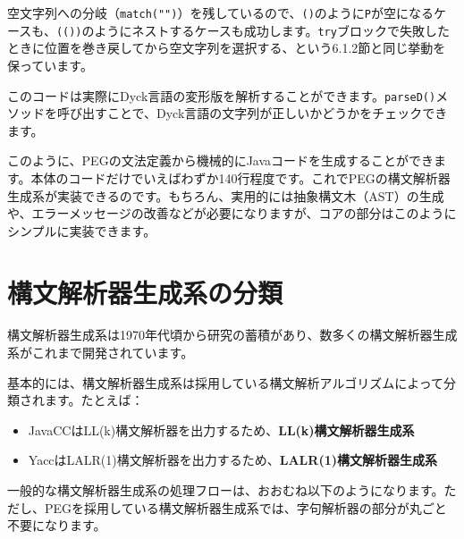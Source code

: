空文字列への分岐（\texttt{match("")}）を残しているので、\texttt{()}のように\texttt{P}が空になるケースも、\texttt{(())}のようにネストするケースも成功します。\texttt{try}ブロックで失敗したときに位置を巻き戻してから空文字列を選択する、という6.1.2節と同じ挙動を保っています。

このコードは実際にDyck言語の変形版を解析することができます。\texttt{parseD()}メソッドを呼び出すことで、Dyck言語の文字列が正しいかどうかをチェックできます。

このように、PEGの文法定義から機械的にJavaコードを生成することができます。本体のコードだけでいえばわずか140行程度です。これでPEGの構文解析器生成系が実装できるのです。もちろん、実用的には抽象構文木（AST）の生成や、エラーメッセージの改善などが必要になりますが、コアの部分はこのようにシンプルに実装できます。

\hypertarget{chapter6-ux69cbux6587ux89e3ux6790ux5668ux751fux6210ux7cfbux306eux5206ux985e}{%
\section{構文解析器生成系の分類}\label{chapter6-ux69cbux6587ux89e3ux6790ux5668ux751fux6210ux7cfbux306eux5206ux985e}}

構文解析器生成系は1970年代頃から研究の蓄積があり、数多くの構文解析器生成系がこれまで開発されています。

基本的には、構文解析器生成系は採用している構文解析アルゴリズムによって分類されます。たとえば：

\begin{itemize}
\tightlist
\item
  JavaCCはLL(k)構文解析器を出力するため、\textbf{LL(k)構文解析器生成系}
\item
  YaccはLALR(1)構文解析器を出力するため、\textbf{LALR(1)構文解析器生成系}
\end{itemize}

一般的な構文解析器生成系の処理フローは、おおむね以下のようになります。ただし、PEGを採用している構文解析器生成系では、字句解析器の部分が丸ごと不要になります。

